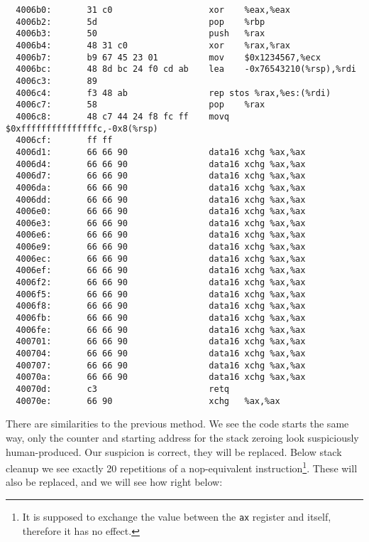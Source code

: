 \documentclass[a4paper,10pt,openright]{memoir}
\newcommand{\code}[1]{\texttt{#1}}
\begin{document}
\begin{verbatim}
  4006b0:       31 c0                   xor    %eax,%eax
  4006b2:       5d                      pop    %rbp
  4006b3:       50                      push   %rax
  4006b4:       48 31 c0                xor    %rax,%rax
  4006b7:       b9 67 45 23 01          mov    $0x1234567,%ecx
  4006bc:       48 8d bc 24 f0 cd ab    lea    -0x76543210(%rsp),%rdi
  4006c3:       89 
  4006c4:       f3 48 ab                rep stos %rax,%es:(%rdi)
  4006c7:       58                      pop    %rax
  4006c8:       48 c7 44 24 f8 fc ff    movq   $0xfffffffffffffffc,-0x8(%rsp)
  4006cf:       ff ff 
  4006d1:       66 66 90                data16 xchg %ax,%ax
  4006d4:       66 66 90                data16 xchg %ax,%ax
  4006d7:       66 66 90                data16 xchg %ax,%ax
  4006da:       66 66 90                data16 xchg %ax,%ax
  4006dd:       66 66 90                data16 xchg %ax,%ax
  4006e0:       66 66 90                data16 xchg %ax,%ax
  4006e3:       66 66 90                data16 xchg %ax,%ax
  4006e6:       66 66 90                data16 xchg %ax,%ax
  4006e9:       66 66 90                data16 xchg %ax,%ax
  4006ec:       66 66 90                data16 xchg %ax,%ax
  4006ef:       66 66 90                data16 xchg %ax,%ax
  4006f2:       66 66 90                data16 xchg %ax,%ax
  4006f5:       66 66 90                data16 xchg %ax,%ax
  4006f8:       66 66 90                data16 xchg %ax,%ax
  4006fb:       66 66 90                data16 xchg %ax,%ax
  4006fe:       66 66 90                data16 xchg %ax,%ax
  400701:       66 66 90                data16 xchg %ax,%ax
  400704:       66 66 90                data16 xchg %ax,%ax
  400707:       66 66 90                data16 xchg %ax,%ax
  40070a:       66 66 90                data16 xchg %ax,%ax
  40070d:       c3                      retq   
  40070e:       66 90                   xchg   %ax,%ax
\end{verbatim}

There are similarities to the previous method. We see the code starts 
the same way, only the counter and starting address for the stack 
zeroing look suspiciously human-produced. Our suspicion is correct, 
they will be replaced. Below stack cleanup we see exactly 20 
repetitions of a nop-equivalent instruction\footnote{It is supposed to 
exchange the value between the \code{ax} register and itself, therefore 
it has no effect.}. These will also be replaced, and we will see how right 
below:
\end{document}
